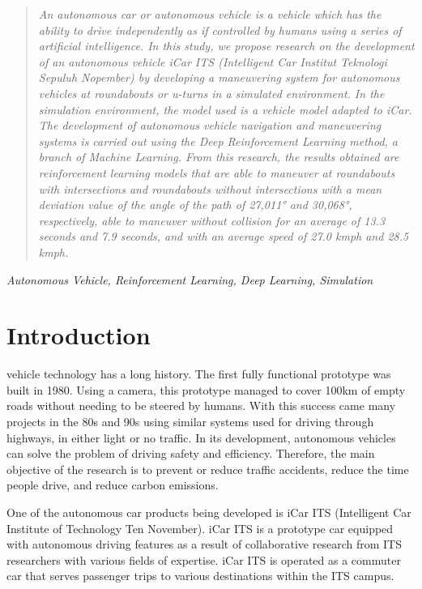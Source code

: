 \documentclass[conference]{IEEEtran}
\begin{document}
	\maketitle
	
	
	\begin{abstract}
		\textit{An autonomous car or autonomous vehicle is a vehicle
		which has the ability to drive independently as if controlled by humans using a series of artificial intelligence. In this study, we propose research on the development of an autonomous vehicle iCar ITS (Intelligent Car Institut Teknologi Sepuluh Nopember) by developing a maneuvering system for autonomous vehicles at roundabouts or u-turns in a simulated environment. In the simulation environment, the model used is a vehicle model adapted to iCar. The development of autonomous vehicle navigation and maneuvering systems is carried out using the Deep Reinforcement Learning method, a branch of Machine Learning. From this research, the results obtained are reinforcement learning models that are able to maneuver at roundabouts with intersections and roundabouts without intersections with a mean deviation value of the angle of the path of 27,011° and 30,068°, respectively, able to maneuver without collision for an average of 13.3 seconds and 7.9 seconds, and with an average speed of 27.0 kmph and 28.5 kmph.}
	\end{abstract}
	\begin{IEEEkeywords}
		\textit{Autonomous Vehicle, Reinforcement Learning, Deep Learning, Simulation}
	\end{IEEEkeywords}
	
	\section{Introduction}
	 vehicle technology has a long history. The first fully functional prototype was built in 1980. Using a camera, this prototype managed to cover 100km of empty roads without needing to be steered by humans. With this success came many projects in the 80s and 90s using similar systems used for driving through highways, in either light or no traffic. In its development, autonomous vehicles can solve the problem of driving safety and efficiency. Therefore, the main objective of the research is to prevent or reduce traffic accidents, reduce the time people drive, and reduce carbon emissions.\cite{cit:autonomous_vehicle_future}\par
	
	One of the autonomous car products being developed is iCar ITS (Intelligent Car Institute of Technology Ten November). iCar ITS is a prototype car equipped with autonomous driving features as a result of collaborative research from ITS researchers with various fields of expertise.\cite{cit:icar_menristekbrin} iCar ITS is operated as a commuter car that serves passenger trips to various destinations within the ITS campus.\cite{cit:icar_its_news}
	
\end{document}
